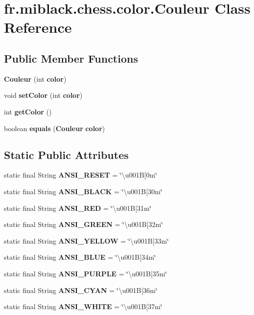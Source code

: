 \section{fr.\-miblack.\-chess.\-color.\-Couleur Class Reference}
\label{classfr_1_1miblack_1_1chess_1_1color_1_1Couleur}
\subsection*{Public Member Functions}
\begin{DoxyCompactItemize}
\item 
{\bf Couleur} (int {\bf color})
\item 
void {\bf set\-Color} (int {\bf color})
\item 
int {\bf get\-Color} ()
\item 
boolean {\bf equals} ({\bf Couleur} {\bf color})
\end{DoxyCompactItemize}
\subsection*{Static Public Attributes}
\begin{DoxyCompactItemize}
\item 
static final String {\bf A\-N\-S\-I\-\_\-\-R\-E\-S\-E\-T} = \char`\"{}\textbackslash{}u001\-B[0m\char`\"{}
\item 
static final String {\bf A\-N\-S\-I\-\_\-\-B\-L\-A\-C\-K} = \char`\"{}\textbackslash{}u001\-B[30m\char`\"{}
\item 
static final String {\bf A\-N\-S\-I\-\_\-\-R\-E\-D} = \char`\"{}\textbackslash{}u001\-B[31m\char`\"{}
\item 
static final String {\bf A\-N\-S\-I\-\_\-\-G\-R\-E\-E\-N} = \char`\"{}\textbackslash{}u001\-B[32m\char`\"{}
\item 
static final String {\bf A\-N\-S\-I\-\_\-\-Y\-E\-L\-L\-O\-W} = \char`\"{}\textbackslash{}u001\-B[33m\char`\"{}
\item 
static final String {\bf A\-N\-S\-I\-\_\-\-B\-L\-U\-E} = \char`\"{}\textbackslash{}u001\-B[34m\char`\"{}
\item 
static final String {\bf A\-N\-S\-I\-\_\-\-P\-U\-R\-P\-L\-E} = \char`\"{}\textbackslash{}u001\-B[35m\char`\"{}
\item 
static final String {\bf A\-N\-S\-I\-\_\-\-C\-Y\-A\-N} = \char`\"{}\textbackslash{}u001\-B[36m\char`\"{}
\item 
static final String {\bf A\-N\-S\-I\-\_\-\-W\-H\-I\-T\-E} = \char`\"{}\textbackslash{}u001\-B[37m\char`\"{}
\end{DoxyCompactItemize}
